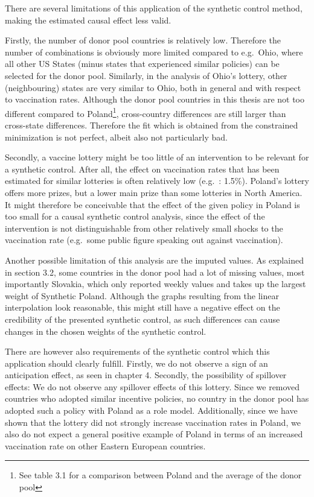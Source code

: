 \documentclass{scrbook}
\begin{document}
There are several limitations of this application of the synthetic
control method, making the estimated causal effect less valid.

Firstly, the number of donor pool countries is relatively low. Therefore
the number of combinations is obviously more limited compared to
e.g.~Ohio, where all other US States (minus states that experienced
similar policies) can be selected for the donor pool. Similarly, in the
analysis of Ohio's lottery, other (neighbouring) states are very similar
to Ohio, both in general and with respect to vaccination rates. Although
the donor pool countries in this thesis are not too different compared
to
Poland\footnote{See table 3.1 for a comparison between Poland and the average of the donor pool},
cross-country differences are still larger than cross-state differences.
Therefore the fit which is obtained from the constrained minimization is
not perfect, albeit also not particularly bad.

Secondly, a vaccine lottery might be too little of an intervention to be
relevant for a synthetic control. After all, the effect on vaccination
rates that has been estimated for similar lotteries is often relatively
low (e.g.~\textcite{barber_conditional_2022}: 1.5\%). Poland's lottery
offers more prizes, but a lower main prize than some lotteries in North
America. It might therefore be conceivable that the effect of the given
policy in Poland is too small for a causal synthetic control analysis,
since the effect of the intervention is not distinguishable from other
relatively small shocks to the vaccination rate (e.g.~some public figure
speaking out against vaccination).

Another possible limitation of this analysis are the imputed values. As
explained in section 3.2, some countries in the donor pool had a lot of
missing values, most importantly Slovakia, which only reported weekly
values and takes up the largest weight of Synthetic Poland. Although the
graphs resulting from the linear interpolation look reasonable, this
might still have a negative effect on the credibility of the presented
synthetic control, as such differences can cause changes in the chosen
weights of the synthetic control.

There are however also requirements of the synthetic control which this
application should clearly fulfill. Firstly, we do not observe a sign of
an anticipation effect, as seen in chapter 4. Secondly, the possibility
of spillover effects: We do not observe any spillover effects of this
lottery. Since we removed countries who adopted similar incentive
policies, no country in the donor pool has adopted such a policy with
Poland as a role model. Additionally, since we have shown that the
lottery did not strongly increase vaccination rates in Poland, we also
do not expect a general positive example of Poland in terms of an
increased vaccination rate on other Eastern European countries.
\end{document}
